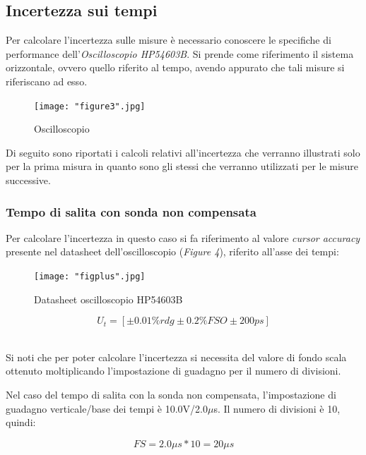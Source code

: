 \documentclass[a4paper]{article}
\begin{document}
\subsection {Incertezza sui tempi}

Per calcolare l'incertezza sulle misure è necessario conoscere le specifiche di performance dell'\emph{Oscilloscopio HP54603B}. Si prende come riferimento il sistema orizzontale, ovvero quello riferito al tempo, avendo appurato che tali misure si riferiscano ad esso.

\begin{figure}[htp]
	\centering
	\texttt{[image: "figure3".jpg]}
	\caption{Oscilloscopio}
	\label{}
\end{figure}

Di seguito sono riportati i calcoli relativi all'incertezza che verranno illustrati solo per la prima misura in quanto sono gli stessi che verranno utilizzati per le misure successive.

\subsubsection{Tempo di salita con sonda non compensata}



Per calcolare l'incertezza in questo caso si fa riferimento al valore \emph{cursor accuracy} presente nel datasheet dell'oscilloscopio (\emph{Figure 4}), riferito all'asse dei tempi:

\begin{figure}[htp]
	\centering
	\texttt{[image: "figplus".jpg]}
	\caption{Datasheet oscilloscopio HP54603B}
	\label{}
\end{figure}


\begin{Large}
	\begin{equation}
  		U_{t}=[\pm 0.01\%rdg\pm 0.2\%FSO \pm 200ps]
	\end{equation}
\end{Large}\\

Si noti che per poter calcolare l'incertezza si necessita del valore di fondo scala ottenuto moltiplicando l'impostazione di guadagno per il numero di divisioni.

Nel caso del tempo di salita con la sonda non compensata, l'impostazione di guadagno verticale/base dei tempi è 10.0V/2.0$\mu$s.
Il numero di divisioni è 10, quindi:
\begin{Large}
	\begin{equation}
  		FS=2.0\mu s * 10= 20\mu s
	\end{equation}
\end{Large}\\
\end{document}
